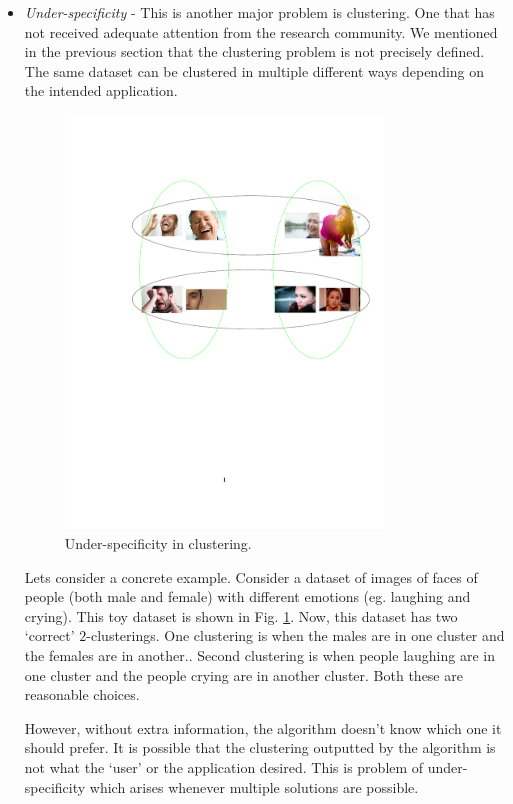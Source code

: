 \documentclass[letterpaper,12pt,titlepage,oneside,final]{book}
\begin{document}
\begin{itemize}
	
	\item \emph{Under-specificity} - This is another major problem is clustering. One that has not received adequate attention from the research community. We mentioned in the previous section that the clustering problem is not precisely defined. The same dataset can be clustered in multiple different ways depending on the intended application. 
	\begin{figure}[!t]
	\begin{center}
	\includegraphics[trim={100 320 30 120},clip,width=0.8\textwidth]{figures/incompatible.pdf}
	\end{center}
	\caption{Under-specificity in clustering.}
	\label{fig:laugh-cry}
	\end{figure}

	Lets consider a concrete example. Consider a dataset of images of faces of people (both male and female) with different emotions (eg. laughing and crying). This toy dataset is shown in Fig. \ref{fig:laugh-cry}. Now, this dataset has two `correct' $2$-clusterings. One clustering is when the males are in one cluster and the females are in another.. Second clustering is when people laughing are in one cluster and the people crying are in another cluster. Both these are reasonable choices. 
	
	However, without extra information, the algorithm doesn't know which one it should prefer. It is possible that the clustering outputted by the algorithm is not what the `user' or the application desired. This is problem of under-specificity which arises whenever multiple solutions are possible. 
\end{itemize}
\end{document}
